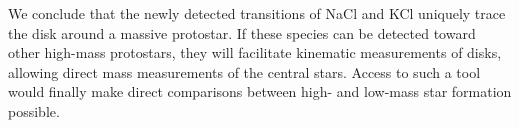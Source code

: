 \documentclass[12pt]{article}
\newcounter{lastnote}
\begin{document}
We conclude that the newly detected transitions of NaCl and KCl uniquely trace
the disk around a massive protostar.  If these species can be detected toward
other high-mass protostars, they will facilitate kinematic measurements of
disks, allowing direct mass measurements of the  central stars.  Access to such
a tool would finally make direct comparisons between high- and low-mass star
formation possible.









\end{document}

